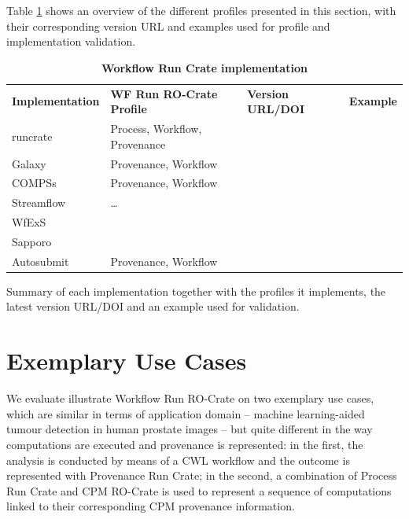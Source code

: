 \documentclass[10pt,letterpaper]{article}
\newlength\savedwidth
\newcommand\thickhline{\noalign{\global\savedwidth\arrayrulewidth\global\arrayrulewidth 2pt}%
\hline
\noalign{\global\arrayrulewidth\savedwidth}}
\begin{document}
Table \ref{implementation_summary_table} shows an overview of the different profiles presented in this section, with their corresponding version URL and examples used for profile and implementation validation.

\begin{table}[!ht]
  \begin{adjustwidth}{-1.4cm}{0in} %
  \centering
  \caption{
  {\bf Workflow Run Crate implementation}}
  \begin{tabular}{l|l|l|l}
  \hline
  {\bf Implementation} & {\bf WF Run RO-Crate Profile} & {\bf Version URL/DOI} &
  {\bf Example}\\
  \thickhline
  runcrate & Process, Workflow, Provenance & &\\
  Galaxy & Provenance, Workflow & & \\
  COMPSs & Provenance, Workflow & & \\
  Streamflow & \ldots{} & & \\
  WfExS & & & \\
  Sapporo & & & \\
  Autosubmit & Provenance, Workflow & & \cite{Kinoshita 2023} \\

  \end{tabular}
  \begin{flushleft} 
    Summary of each implementation together with the profiles it implements, the latest version URL/DOI and an example used for validation.
  \end{flushleft}
  \label{implementation_summary_table}
  \end{adjustwidth}
  \end{table}
  


\section{Exemplary Use Cases}\label{exemplary-use-cases}

We evaluate illustrate Workflow Run RO-Crate on two exemplary use cases, which are similar in terms of application domain -- machine learning-aided tumour detection in human prostate images -- but quite different in the way computations are executed and provenance is represented: in the first, the analysis is conducted by means of a CWL workflow and the outcome is represented with Provenance Run Crate; in the second, a combination of Process Run Crate and CPM RO-Crate is used to represent a sequence of computations linked to their corresponding CPM provenance information.
\end{document}
